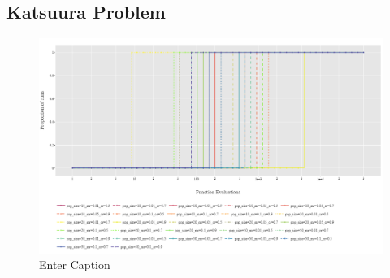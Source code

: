 \documentclass{article}
\begin{document}
\subsection{Katsuura Problem}
\begin{figure}[h!]
    \centering
    \includegraphics[width=1\linewidth]{Graphs/Katsuura/Cumulative_Distribution.png}
    \caption{Enter Caption}
    \label{fig:enter-label}
\end{figure}
\end{document}
